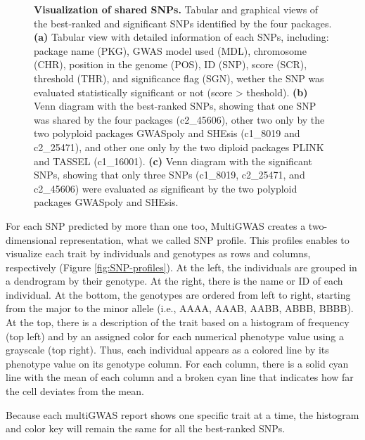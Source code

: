 \documentclass{article}
\begin{document}
\begin{figure}[H]
\caption{\scriptsize \textbf{Visualization of shared SNPs.} Tabular and graphical views of the best-ranked and significant SNPs identified by the four packages. \textbf{(a)} Tabular view with detailed information of each SNPs, including: package name (PKG), GWAS model used (MDL), chromosome (CHR), position in the genome (POS), ID (SNP), score (SCR), threshold (THR), and significance flag (SGN), wether the SNP was evaluated statistically significant or not (score > theshold). \textbf{(b)} Venn diagram with the best-ranked SNPs, showing that one SNP was shared by the four packages (c2\_45606), other two only by the two polyploid packages GWASpoly and SHEsis (c1\_8019 and c2\_25471), and other one only by the two diploid packages PLINK and TASSEL (c1\_16001). \textbf{(c)} Venn diagram with the significant SNPs, showing that only three SNPs (c1\_8019, c2\_25471, and c2\_45606) were evaluated as significant by the two polyploid packages GWASpoly and SHEsis.\label{fig:-View-Shared-SNPs}}
\end{figure}



For each SNP predicted by more than one too, MultiGWAS creates a two-dimensional representation, what we called SNP profile. This profiles enables to visualize each trait by individuals and genotypes as rows and columns, respectively (Figure \ref{fig:SNP-profiles}). At the left, the individuals are grouped in a dendrogram by their genotype. At the right, there is the name or ID of each individual. At the bottom, the genotypes are ordered from left to right, starting from the major to the minor allele (i.e., AAAA, AAAB, AABB, ABBB, BBBB). At the top, there is a description of the trait based on a histogram of frequency (top left) and by an assigned color for each numerical phenotype value using a grayscale (top right). Thus, each individual appears as a colored line by its phenotype value on its genotype column. For each column, there is a solid cyan line with the mean of each column and a broken cyan line that indicates how far the cell deviates from the mean.

Because each multiGWAS report shows one specific trait at a time, the histogram and color key will remain the same for all the best-ranked SNPs.
\end{document}
